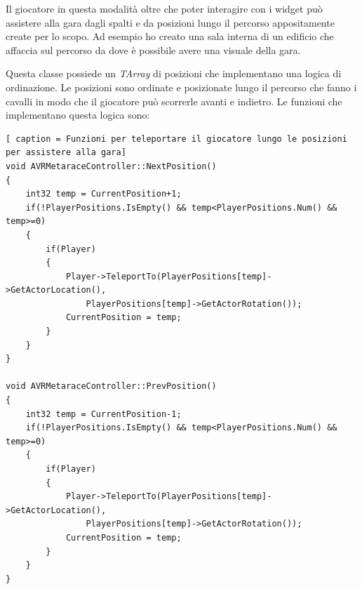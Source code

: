     Il giocatore in questa modalità oltre che poter interagire con i widget può assistere alla gara dagli spalti e da posizioni lungo il percorso appositamente create per lo scopo.
    Ad esempio ho creato una sala interna di un edificio che affaccia sul percorso da dove è possibile avere una visuale della gara.

    Questa classe possiede un \textit{TArray} di posizioni che implementano una logica di ordinazione.
    Le posizioni sono ordinate e posizionate lungo il percorso che fanno i cavalli in modo che il giocatore può scorrerle avanti e indietro.
    Le funzioni che implementano questa logica sono:
    
    \begin{lstlisting}[ caption = Funzioni per teleportare il giocatore lungo le posizioni per assistere alla gara]
void AVRMetaraceController::NextPosition()
{
    int32 temp = CurrentPosition+1;
    if(!PlayerPositions.IsEmpty() && temp<PlayerPositions.Num() && temp>=0)
    {
        if(Player)
        {
            Player->TeleportTo(PlayerPositions[temp]->GetActorLocation(),
                PlayerPositions[temp]->GetActorRotation());
            CurrentPosition = temp;
        }
    }
}

void AVRMetaraceController::PrevPosition()
{
    int32 temp = CurrentPosition-1;
    if(!PlayerPositions.IsEmpty() && temp<PlayerPositions.Num() && temp>=0)
    {
        if(Player)
        {
            Player->TeleportTo(PlayerPositions[temp]->GetActorLocation(),
                PlayerPositions[temp]->GetActorRotation());
            CurrentPosition = temp;
        }
    }
}
    \end{lstlisting}



